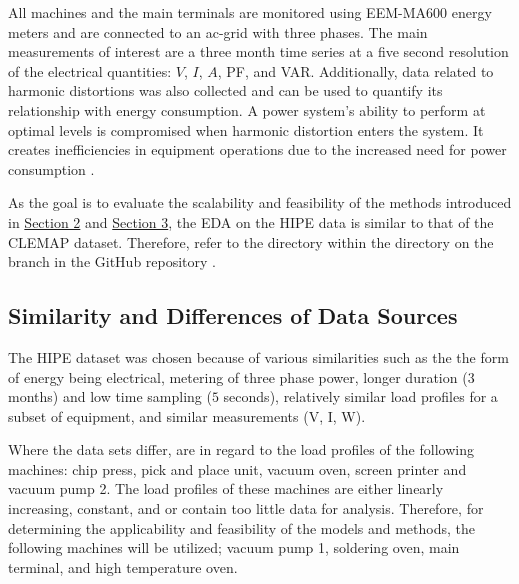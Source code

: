 All machines and the main terminals are monitored using EEM-MA600 energy meters and are connected to an ac-grid with three phases. The main measurements of interest are a three month time series at a five second resolution of the electrical quantities: $V$, $I$, $A$, PF, and \ac{VAR}. Additionally, data related to harmonic distortions was also collected and can be used to quantify its relationship with energy consumption. A power system’s ability to perform at optimal levels is compromised when harmonic distortion enters the system. It creates inefficiencies in equipment operations due to the increased need for power consumption \cite{noauthor_harmonic_2021}. 

As the goal is to evaluate the scalability and feasibility of the methods introduced in \hyperlink{section.2}{Section 2} and \hyperlink{section.3}{Section 3}, the EDA on the HIPE data is similar to that of the CLEMAP dataset. Therefore, refer to the  directory within the  directory on the   branch in the GitHub repository \cite{Stechschulte_Gaussian_Processes_for_2022}. 

\subsection{Similarity and Differences of Data Sources}

The HIPE dataset was chosen because of various similarities such as the the form of energy being electrical, metering of three phase power, longer duration ($3$ months) and low time sampling ($5$ seconds), relatively similar load profiles for a subset of equipment, and similar measurements (V, I, W). 

Where the data sets differ, are in regard to the load profiles of the following machines: chip press, pick and place unit, vacuum oven, screen printer and vacuum pump 2. The load profiles of these machines are either linearly increasing, constant, and or contain too little data for analysis. Therefore, for determining the applicability and feasibility of the models and methods, the following machines will be utilized; vacuum pump 1, soldering oven, main terminal, and high temperature oven.
